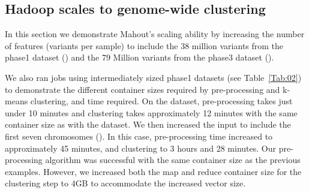 \documentclass{bioinfo}
\begin{document}


\subsection*{Hadoop scales to genome-wide clustering}

In this section we demonstrate Mahout's scaling ability by increasing the number of features (variants per sample) to include the 38 million variants from the phase1 dataset (\FullPhaseone{}) and the 79 Million variants from the phase3 dataset (\FullPhasethree{}). 

We also ran jobs using intermediately sized phase1 datasets (see Table~\ref{Tab:02}) to demonstrate the different container sizes required by pre-processing and k-means clustering, and time required.
On the \OnePhaseone{} dataset, pre-processing takes just under 10 minutes and clustering takes approximately 12 minutes with the same container size as with the \NinteenPhaseone{} dataset.
We then increased the input to include the first seven chromosomes (\SevenPhaseone{}). In this case, pre-processing time increased to approximately 45 minutes, and clustering to 3 hours and 28 minutes.
Our pre-processing algorithm was successful with the same container size as the previous examples. However, we increased both the map and reduce container size for the clustering step to 4GB to accommodate the increased vector size.
\end{document}
